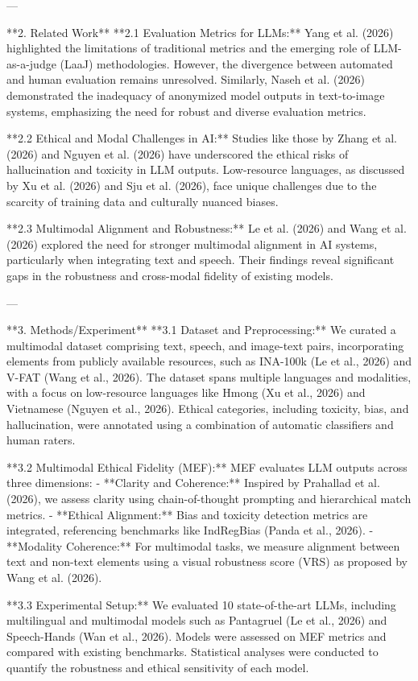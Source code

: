 ---

**2. Related Work**  
**2.1 Evaluation Metrics for LLMs:**  
Yang et al. (2026) highlighted the limitations of traditional metrics and the emerging role of LLM-as-a-judge (LaaJ) methodologies. However, the divergence between automated and human evaluation remains unresolved. Similarly, Naseh et al. (2026) demonstrated the inadequacy of anonymized model outputs in text-to-image systems, emphasizing the need for robust and diverse evaluation metrics.

**2.2 Ethical and Modal Challenges in AI:**  
Studies like those by Zhang et al. (2026) and Nguyen et al. (2026) have underscored the ethical risks of hallucination and toxicity in LLM outputs. Low-resource languages, as discussed by Xu et al. (2026) and Sju et al. (2026), face unique challenges due to the scarcity of training data and culturally nuanced biases.

**2.3 Multimodal Alignment and Robustness:**  
Le et al. (2026) and Wang et al. (2026) explored the need for stronger multimodal alignment in AI systems, particularly when integrating text and speech. Their findings reveal significant gaps in the robustness and cross-modal fidelity of existing models.

---

**3. Methods/Experiment**  
**3.1 Dataset and Preprocessing:**  
We curated a multimodal dataset comprising text, speech, and image-text pairs, incorporating elements from publicly available resources, such as INA-100k (Le et al., 2026) and V-FAT (Wang et al., 2026). The dataset spans multiple languages and modalities, with a focus on low-resource languages like Hmong (Xu et al., 2026) and Vietnamese (Nguyen et al., 2026). Ethical categories, including toxicity, bias, and hallucination, were annotated using a combination of automatic classifiers and human raters.

**3.2 Multimodal Ethical Fidelity (MEF):**  
MEF evaluates LLM outputs across three dimensions:  
- **Clarity and Coherence:** Inspired by Prahallad et al. (2026), we assess clarity using chain-of-thought prompting and hierarchical match metrics.  
- **Ethical Alignment:** Bias and toxicity detection metrics are integrated, referencing benchmarks like IndRegBias (Panda et al., 2026).  
- **Modality Coherence:** For multimodal tasks, we measure alignment between text and non-text elements using a visual robustness score (VRS) as proposed by Wang et al. (2026).

**3.3 Experimental Setup:**  
We evaluated 10 state-of-the-art LLMs, including multilingual and multimodal models such as Pantagruel (Le et al., 2026) and Speech-Hands (Wan et al., 2026). Models were assessed on MEF metrics and compared with existing benchmarks. Statistical analyses were conducted to quantify the robustness and ethical sensitivity of each model.

